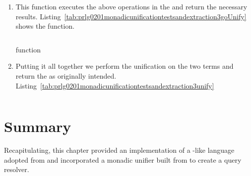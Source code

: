 \documentclass[thesis-solanki.tex]{subfiles}
\begin{document}
\begin{enumerate}
\item{}

This function executes the above operations in the  and return the necessary results.
Listing~\ref{tab:prlg0201monadicunificationtestsandextraction3goUnify} shows the  function.

\begin{code-list}[H]
  \begin{singlespace}
    \inputminted[linenos,firstline=95, lastline=107]{haskell}{haskell-proto2-monadic-unification-tests-and-extraction.hs}
  \end{singlespace}
\caption{ function}
\label{tab:prlg0201monadicunificationtestsandextraction3goUnify}
\end{code-list}

\item{}

Putting it all together we perform the unification on the two terms and return the  as originally intended.
Listing~\ref{tab:prlg0201monadicunificationtestsandextraction3unify}

\begin{code-list}[H]
  \begin{singlespace}
    \inputminted[linenos,firstline=121, lastline=131]{haskell}{haskell-proto2-monadic-unification-tests-and-extraction.hs}
  \end{singlespace}
\caption{}
\label{tab:prlg0201monadicunificationtestsandextraction3unify}
\end{code-list}


\end{enumerate}



\section{Summary}
Recapitulating, this chapter provided an implementation of a -like language adopted from
\cite{prolog-lib} and incorporated a monadic unifier built from \cite{unification-fd-lib} to create a
 query resolver.

\ifMain\ifDraft
\begin{scope}
  \nolinenumbers
  \enotesize
  \par
  \begin{singlespace}
  \setlength{\parskip}{12pt plus 2pt minus 1pt}
  \theendnotes
  \par
  \end{singlespace}
\end{scope}
\fi\fi
\end{document}
